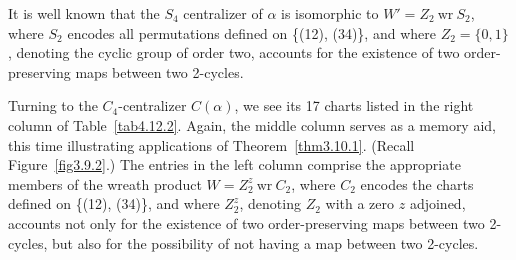 \documentclass{surv-l}
\numberwithin{equation}{section}
\numberwithin{table}{section}
\numberwithin{figure}{section}
\theoremstyle{plain}
\theoremstyle{definition}
\begin{document}
It is well known that the $S_{4}$ centralizer of $\alpha$ is
isomorphic to $W'=Z_{2}\  \mathrm{wr} \ S_{2}$, where $S_{2}$
encodes all permutations defined on \{(12), (34)\}, and where
$Z_{2}=\{0,1\}$, denoting the cyclic group of order two, accounts
for the existence of two order-preserving maps between two
2-cycles.

Turning to the $C_{4}$-centralizer $C(\alpha)$, we see its 17
charts listed in the right column of Table~\ref{tab4.12.2}. Again,
the middle column serves as a memory aid, this time illustrating
applications of Theorem~\ref{thm3.10.1}. (Recall
Figure~\ref{fig3.9.2}.) The entries in the left column comprise
the appropriate members of the wreath product $W=Z_{2}^{z}\
\mathrm{wr}\  C_{2}$, where $C_{2}$ encodes the charts defined on
\{(12), (34)\}, and where $Z_{2}^{z}$, denoting $Z_{2}$ with a
zero $z$ adjoined, accounts not only for the existence of two
order-preserving maps between two 2-cycles, but also for the
possibility of not having a map between two 2-cycles.
\end{document}
